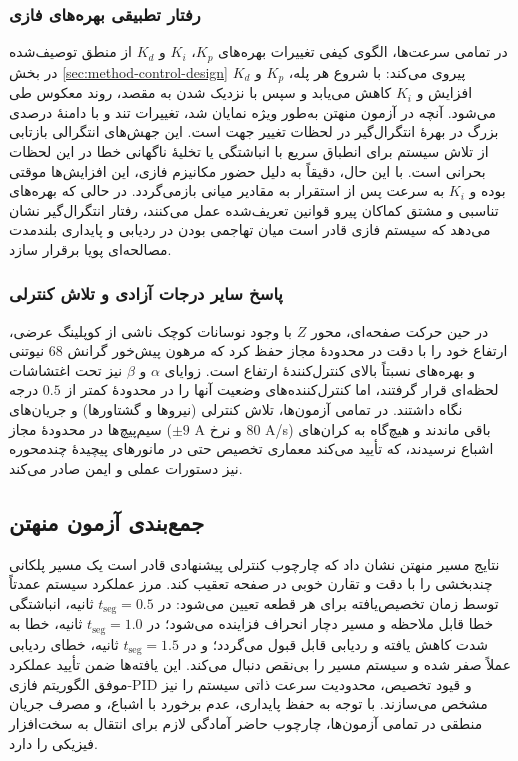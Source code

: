 \subsubsection{رفتار تطبیقی بهره‌های فازی}
\label{subsubsec:results-manhattan-fuzzy}
در تمامی سرعت‌ها، الگوی کیفی تغییرات بهره‌های $K_p$، $K_i$ و $K_d$ از منطق توصیف‌شده در بخش \ref{sec:method-control-design} پیروی می‌کند: با شروع هر پله، $K_p$ و $K_d$ افزایش و $K_i$ کاهش می‌یابد و سپس با نزدیک شدن به مقصد، روند معکوس طی می‌شود. آنچه در آزمون منهتن به‌طور ویژه نمایان شد، تغییرات تند و با دامنهٔ درصدی بزرگ در بهرهٔ انتگرال‌گیر در لحظات تغییر جهت است. این جهش‌های انتگرالی بازتابی از تلاش سیستم برای انطباق سریع با انباشتگی یا تخلیهٔ ناگهانی خطا در این لحظات بحرانی است. با این حال، دقیقاً به دلیل حضور مکانیزم فازی، این افزایش‌ها موقتی بوده و $K_i$ به سرعت پس از استقرار به مقادیر میانی بازمی‌گردد. در حالی که بهره‌های تناسبی و مشتق کماکان پیرو قوانین تعریف‌شده عمل می‌کنند، رفتار انتگرال‌گیر نشان می‌دهد که سیستم فازی قادر است میان تهاجمی بودن در ردیابی و پایداری بلندمدت مصالحه‌ای پویا برقرار سازد.

\subsubsection{پاسخ سایر درجات آزادی و تلاش کنترلی}
\label{subsubsec:results-manhattan-other-dof}
در حین حرکت صفحه‌ای، محور $Z$ با وجود نوسانات کوچک ناشی از کوپلینگ عرضی، ارتفاع خود را با دقت در محدودهٔ مجاز حفظ کرد که مرهون پیش‌خور گرانش $68$ نیوتنی و بهره‌های نسبتاً بالای کنترل‌کنندهٔ ارتفاع است. زوایای $\alpha$ و $\beta$ نیز تحت اغتشاشات لحظه‌ای قرار گرفتند، اما کنترل‌کننده‌های وضعیت آنها را در محدودهٔ کمتر از $0.5$ درجه نگاه داشتند. در تمامی آزمون‌ها، تلاش کنترلی (نیروها و گشتاورها) و جریان‌های سیم‌پیچ‌ها در محدودهٔ مجاز ($\pm 9$ A و نرخ $80$ A/s) باقی ماندند و هیچ‌گاه به کران‌های اشباع نرسیدند، که تأیید می‌کند معماری تخصیص حتی در مانورهای پیچیدهٔ چندمحوره نیز دستورات عملی و ایمن صادر می‌کند.

\subsection{جمع‌بندی آزمون منهتن}
\label{subsec:results-manhattan-summary}
نتایج مسیر منهتن نشان داد که چارچوب کنترلی پیشنهادی قادر است یک مسیر پلکانی چندبخشی را با دقت و تقارن خوبی در صفحه تعقیب کند. مرز عملکرد سیستم عمدتاً توسط زمان تخصیص‌یافته برای هر قطعه تعیین می‌شود: در $t_{\text{seg}} = 0.5$ ثانیه، انباشتگی خطا قابل ملاحظه و مسیر دچار انحراف فزاینده می‌شود؛ در $t_{\text{seg}} = 1.0$ ثانیه، خطا به شدت کاهش یافته و ردیابی قابل قبول می‌گردد؛ و در $t_{\text{seg}} = 1.5$ ثانیه، خطای ردیابی عملاً صفر شده و سیستم مسیر را بی‌نقص دنبال می‌کند. این یافته‌ها ضمن تأیید عملکرد موفق الگوریتم فازی-PID و قیود تخصیص، محدودیت سرعت ذاتی سیستم را نیز مشخص می‌سازند. با توجه به حفظ پایداری، عدم برخورد با اشباع، و مصرف جریان منطقی در تمامی آزمون‌ها، چارچوب حاضر آمادگی لازم برای انتقال به سخت‌افزار فیزیکی را دارد.


